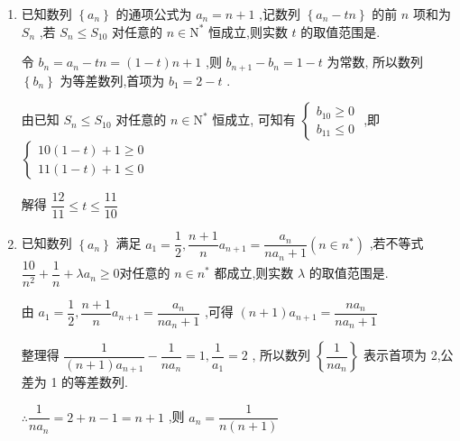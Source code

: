 \begin{enumerate}
\begin{jieda}
        故答案为： $\dfrac{2020}{2021}$ .
    \end{jieda}
    
    \item 已知数列 $\left\{  {a}_{n}\right\}$ 的通项公式为 ${a}_{n} = n + 1$ ,记数列 $\left\{  {{a}_{n} - {tn}}\right\}$ 的前 $n$ 项和为 ${S}_{n}$ ,若 ${S}_{n} \leq  {S}_{10}$ 对任意的 $n \in  {\mathrm{N}}^{ * }$ 恒成立,则实数 $t$ 的取值范围是.
    \begin{jieda}
        令 ${b}_{n} = {a}_{n} - {tn} = \left( {1 - t}\right) n + 1$ ,则 ${b}_{n + 1} - {b}_{n} = 1 - t$ 为常数,
        所以数列 $\left\{  {b}_{n}\right\}$ 为等差数列,首项为 ${b}_{1} = 2 - t$ .
        
        由已知 ${S}_{n} \leq  {S}_{10}$ 对任意的 $n \in  {\mathrm{N}}^{ * }$ 恒成立,
        可知有 $\left\{  \begin{array}{l} {b}_{10} \geq  0 \\  {b}_{11} \leq  0 \end{array}\right.$ ,即 $\left\{  \begin{array}{l} {10}\left( {1 - t}\right)  + 1 \geq  0 \\  {11}\left( {1 - t}\right)  + 1 \leq  0 \end{array}\right.$
        
        解得 $\dfrac{12}{11} \leq  t \leq  \dfrac{11}{10}$
    \end{jieda}
    
    \item 已知数列 $\left\{  {a}_{n}\right\}$ 满足 ${a}_{1} = \dfrac{1}{2},\dfrac{n + 1}{n}{a}_{n + 1} = \dfrac{{a}_{n}}{n{a}_{n} + 1}\left( {n \in  {n}^{ * }}\right)$ ,若不等式 $\dfrac{10}{{n}^{2}} + \dfrac{1}{n} + \lambda {a}_{n} \geq  0$对任意的 $n \in  {n}^{ * }$ 都成立,则实数 $\lambda$ 的取值范围是.
    \begin{jieda}
        由 ${a}_{1} = \dfrac{1}{2},\dfrac{n + 1}{n}{a}_{n + 1} = \dfrac{{a}_{n}}{n{a}_{n} + 1}$ ,可得 $\left( {n + 1}\right) {a}_{n + 1} = \dfrac{n{a}_{n}}{n{a}_{n} + 1}$ 
        
        整理得 $\dfrac{1}{\left( {n + 1}\right) {a}_{n + 1}} - \dfrac{1}{n{a}_{n}} = 1,\dfrac{1}{{a}_{1}} = 2$ ,
        所以数列 $\left\{  \dfrac{1}{n{a}_{n}}\right\}$ 表示首项为 2,公差为 1 的等差数列.
        
        $\therefore \dfrac{1}{n{a}_{n}} = 2 + n - 1 = n + 1$ ,则 ${a}_{n} = \dfrac{1}{n\left( {n + 1}\right) }$
        

\end{jieda}
\end{enumerate}
